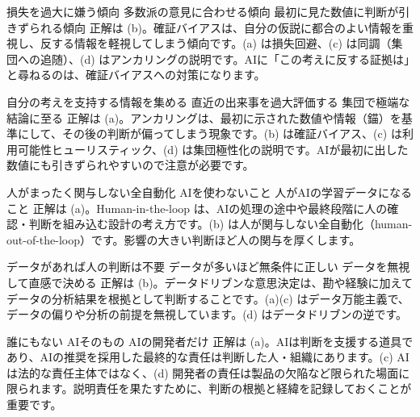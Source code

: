 
%
  {損失を過大に嫌う傾向}%
  {}%
  {多数派の意見に合わせる傾向}%
  {最初に見た数値に判断が引きずられる傾向}%
  {正解は (b)。確証バイアスは、自分の仮説に都合のよい情報を重視し、反する情報を軽視してしまう傾向です。(a) は損失回避、(c) は同調（集団への追随）、(d) はアンカリングの説明です。AIに「この考えに反する証拠は」と尋ねるのは、確証バイアスへの対策になります。}

%
  {}%
  {自分の考えを支持する情報を集める}%
  {直近の出来事を過大評価する}%
  {集団で極端な結論に至る}%
  {正解は (a)。アンカリングは、最初に示された数値や情報（錨）を基準にして、その後の判断が偏ってしまう現象です。(b) は確証バイアス、(c) は利用可能性ヒューリスティック、(d) は集団極性化の説明です。AIが最初に出した数値にも引きずられやすいので注意が必要です。}

%
  {}%
  {人がまったく関与しない全自動化}%
  {AIを使わないこと}%
  {人がAIの学習データになること}%
  {正解は (a)。Human-in-the-loop は、AIの処理の途中や最終段階に人の確認・判断を組み込む設計の考え方です。(b) は人が関与しない全自動化（human-out-of-the-loop）です。影響の大きい判断ほど人の関与を厚くします。}

%
  {データがあれば人の判断は不要}%
  {}%
  {データが多いほど無条件に正しい}%
  {データを無視して直感で決める}%
  {正解は (b)。データドリブンな意思決定は、勘や経験に加えてデータの分析結果を根拠として判断することです。(a)(c) はデータ万能主義で、データの偏りや分析の前提を無視しています。(d) はデータドリブンの逆です。}

%
  {}%
  {誰にもない}%
  {AIそのもの}%
  {AIの開発者だけ}%
  {正解は (a)。AIは判断を支援する道具であり、AIの推奨を採用した最終的な責任は判断した人・組織にあります。(c) AI は法的な責任主体ではなく、(d) 開発者の責任は製品の欠陥など限られた場面に限られます。説明責任を果たすために、判断の根拠と経緯を記録しておくことが重要です。}
